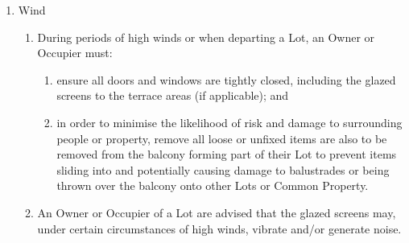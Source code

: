 \documentclass{article}
\begin{document}
\begin{enumerate}[label=\arabic*.]
\begin{enumerate}[label=\arabic{enumi}.\arabic*.]
\begin{enumerate}[label=\arabic{enumi}.\arabic*.]
\begin{enumerate}[label=(\arabic*)]
\item  An Owner or Occupier of a Lot must:

\begin{enumerate}[label=(\alph*)]

\item  keep their Lot secure;

\item  ensure any garden area associated with their Lot for their exclusive use is maintained (i.e. lawn area mowed, plants maintained, shrubs/trees cut back etc.); and

\item  be appropriately clothes when on any part of their Lot visible from another Lot or from Common Property.

\end{enumerate}

\end{enumerate}

\item  Wind

\begin{enumerate}[label=(\arabic*)]

\item  During periods of high winds or when departing a Lot, an Owner or Occupier must:

\begin{enumerate}[label=(\alph*)]

\item  ensure all doors and windows are tightly closed, including the glazed screens to the terrace areas (if applicable); and

\item  in order to minimise the likelihood of risk and damage to surrounding people or property, remove all loose or unfixed items are also to be removed from the balcony forming part of their Lot to prevent items sliding into and potentially causing damage to balustrades or being thrown over the balcony onto other Lots or Common Property.

\end{enumerate}

\item  An Owner or Occupier of a Lot are advised that the glazed screens may, under certain circumstances of high winds, vibrate and/or generate noise.

\end{enumerate}

\end{enumerate}


\end{enumerate}
\end{enumerate}
\end{document}
